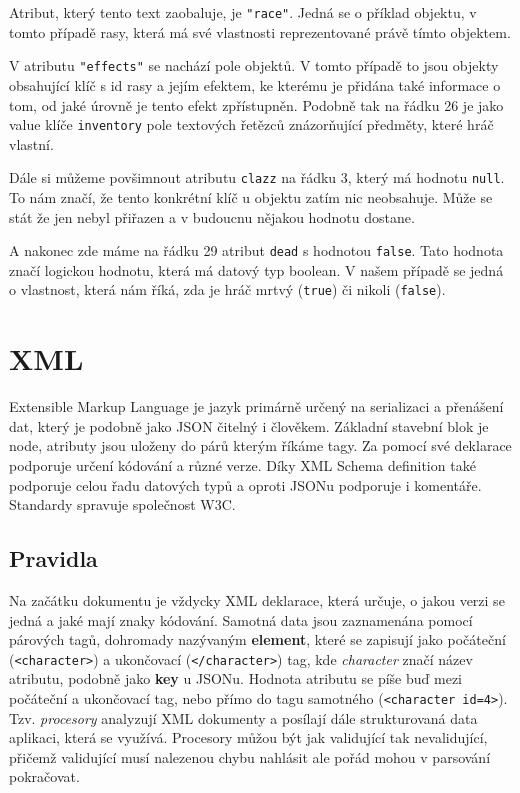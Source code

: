 Atribut, který tento text zaobaluje, je \texttt{"race"}. Jedná se o příklad objektu, v tomto případě rasy, která má své vlastnosti reprezentované právě tímto objektem.

V atributu \texttt{"effects"} se nachází pole objektů. V tomto případě to jsou objekty obsahující klíč s id rasy a jejím efektem, ke kterému je přidána také informace o tom, od jaké úrovně je tento efekt zpřístupněn. Podobně tak na řádku 26 je jako value klíče \texttt{inventory} pole textových řetězců znázorňující předměty, které hráč vlastní.

Dále si můžeme povšimnout atributu \texttt{clazz} na řádku 3, který má hodnotu \texttt{null}. To nám značí, že tento konkrétní klíč u objektu zatím nic neobsahuje. Může se stát že jen nebyl přiřazen a v budoucnu nějakou hodnotu dostane.

A nakonec zde máme na řádku 29 atribut \texttt{dead} s hodnotou \texttt{false}. Tato hodnota značí logickou hodnotu, která má datový typ boolean. V našem případě se jedná o vlastnost, která nám říká, zda je hráč mrtvý (\texttt{true}) či nikoli (\texttt{false}).


\section{XML}
Extensible Markup Language je jazyk primárně určený na serializaci a přenášení dat, který je podobně jako JSON čitelný i člověkem. Základní stavební blok je node, atributy jsou uloženy do párů kterým říkáme tagy. Za pomocí své deklarace podporuje určení kódování a různé verze. Díky XML Schema definition také podporuje celou řadu datových typů a oproti JSONu podporuje i komentáře. Standardy spravuje společnost W3C. %


\subsection{Pravidla}
Na začátku dokumentu je vždycky XML deklarace, která určuje, o jakou verzi se jedná a jaké mají znaky kódování.
Samotná data jsou zaznamenána pomocí párových tagů, dohromady nazývaným \textbf{element}, které se zapisují jako počáteční (\texttt{<character>}) a ukončovací (\texttt{</character>}) tag, kde \textit{character} značí název atributu, podobně jako \textbf{key} u JSONu. Hodnota atributu se píše buď mezi počáteční a ukončovací tag, nebo přímo do tagu samotného (\texttt{<character id=4>}). Tzv. \textit{procesory} analyzují XML dokumenty a posílají dále strukturovaná data aplikaci, která se využívá. Procesory můžou být jak validující tak nevalidující, přičemž validující musí nalezenou chybu nahlásit ale pořád mohou v parsování pokračovat.

